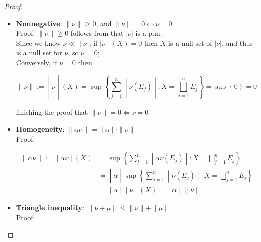 \documentclass{qlnotes-export}
\begin{document}
\begin{proof}
\begin{itemize}
\item
  \textbf{Nonnegative}: \(\parallel \nu \parallel \geq 0\), and \(\parallel \nu \parallel = 0\Leftrightarrow\nu = 0\)\\
  Proof: \(\parallel \nu \parallel \geq 0\) follows from that \(|\nu|\) is a p.m.\\
  Since we know \(\left. \nu \ll \middle| \nu| \right.\), if \(\left. |\nu \middle| (X) = 0 \right.\) then \(X\) is a null set of \(|\nu|\), and thus is a null set for \(\nu\), so \(\nu = 0\);\\
  Conversely, if \(\nu = 0\) then

  \[\left. \parallel \nu \parallel := \middle| \nu \middle| (X) = \sup\left\{ \sum\limits_{j = 1}^{n} \middle| \nu(E_{j}) \middle| :X = \bigsqcup\limits_{j = 1}^{n}E_{j} \right\} = \sup\left\{ 0 \right\} = 0 \right.\]

  finishing the proof that \(\parallel \nu \parallel = 0\Leftrightarrow\nu = 0\)
\item
  \textbf{Homogeneity}: \(\left. \parallel \alpha\nu \parallel = \middle| \alpha \middle| \cdot \parallel \nu \parallel \right.\)\\
  Proof:

  \[\begin{matrix}
  \left. \parallel \alpha\nu \parallel := \middle| \alpha\nu \middle| (X) \right. & {= \sup\left\{ \sum\limits_{j = 1}^{n} \middle| \alpha\nu(E_{j}) \middle| :X = \bigsqcup\limits_{j = 1}^{n}E_{j} \right\}} \\
   & \left. = \middle| \alpha \middle| \sup\left\{ \sum\limits_{j = 1}^{n} \middle| \nu(E_{j}) \middle| :X = \bigsqcup\limits_{j = 1}^{n}E_{j} \right\} \right. \\
   & \left. = \middle| \alpha \middle| \middle| \nu \middle| (X) = \middle| \alpha \middle| \parallel \nu \parallel \right.
  \end{matrix}\]
\item
  \textbf{Triangle inequality}: \(\parallel \nu + \mu \parallel \leq \parallel \nu \parallel + \parallel \mu \parallel\)\\
  Proof:


\end{itemize}
\end{proof}
\end{document}
